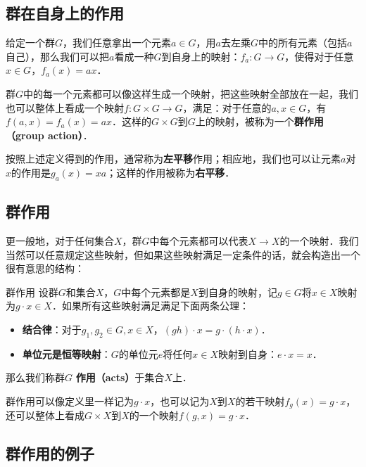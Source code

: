 
\subsection{群在自身上的作用}

给定一个群$G$，我们任意拿出一个元素$a\in G$，用$a$去左乘$G$中的所有元素（包括$a$自己），那么我们可以把$a$看成一种$G$到自身上的映射：$f_a:G\rightarrow G$，使得对于任意$x\in G$，$f_a(x)=ax$．

群$G$中的每一个元素都可以像这样生成一个映射，把这些映射全部放在一起，我们也可以整体上看成一个映射$f:G\times G\rightarrow G$，满足：对于任意的$a, x\in G$，有$f(a,x)=f_a(x)=ax$．这样的$G\times G$到$G$上的映射，被称为一个\textbf{群作用（group action）}．

按照上述定义得到的作用，通常称为\textbf{左平移}作用；相应地，我们也可以让元素$a$对$x$的作用是$g_a(x)=xa$；这样的作用被称为\textbf{右平移}．

\subsection{群作用}

更一般地，对于任何集合$X$，群$G$中每个元素都可以代表$X\rightarrow X$的一个映射．我们当然可以任意规定这些映射，但如果这些映射满足一定条件的话，就会构造出一个很有意思的结构：

\begin{definition}{群作用}
设群$G$和集合$X$，$G$中每个元素都是$X$到自身的映射，记$g\in G$将$x\in X$映射为$g\cdot x\in X$．如果所有这些映射满足满足下面两条公理：
\begin{itemize}
\item \textbf{结合律}：对于$g_1, g_2\in G, x\in X$，$(gh)\cdot x=g\cdot (h\cdot x)$．
\item \textbf{单位元是恒等映射}：$G$的单位元$e$将任何$x\in X$映射到自身：$e\cdot x=x$．
\end{itemize}

那么我们称群$G$ \textbf{作用（acts）}于集合$X$上．

\end{definition}

群作用可以像定义里一样记为$g\cdot x$，也可以记为$X$到$X$的若干映射$f_g(x)=g\cdot x$，还可以整体上看成$G\times X$到$X$的一个映射$f(g, x)=g\cdot x$．

\subsection{群作用的例子}

